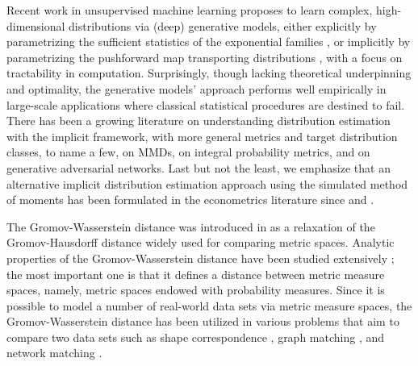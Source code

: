 \documentclass[11pt]{article}
\begin{document}
Recent work in unsupervised machine learning proposes to learn complex, high-dimensional distributions via (deep) generative models, either explicitly by parametrizing the sufficient statistics of the exponential families \citep{doersch2016TutorialVariationalAutoencoders,kingma2013auto}, or implicitly by parametrizing the pushforward map transporting distributions \citep{dziugaite_roy_ghahramani_2015,goodfellow_2014}, with a focus on tractability in computation. Surprisingly, though lacking theoretical underpinning and optimality, the generative models’ approach performs well empirically in large-scale applications where classical statistical procedures are destined to fail. There has been a growing literature on understanding distribution estimation with the implicit framework, with more general metrics and target distribution classes, to name a few, \cite{muandet_fukumizu_sriperumbudur_scholkopf_2017, li_swersky_zemel_2015, dziugaite_roy_ghahramani_2015} on MMDs, \cite{sriperumbudur2012empirical, liang2019EstimatingCertain} on integral probability metrics, and \cite{mroueh2017sobolev, arora2017generalization,liang2018HowWell,singh2018minimax,bai2018approximability, weed2019estimation, lei2019sgd, chen2020statistical} on generative adversarial networks. Last but not the least, we emphasize that an alternative implicit distribution estimation approach using the simulated method of moments has been formulated in the econometrics literature since \cite{mcfadden1989MethodSimulated,pakes1989SimulationAsymptotics} and \cite{gourieroux1997SimulationbasedEconometric}. 


The Gromov-Wasserstein distance was introduced in \cite{memoli_2007} as a relaxation of the Gromov-Hausdorff distance widely used for comparing metric spaces. Analytic properties of the Gromov-Wasserstein distance have been studied extensively \citep{memoli_2011,sturm_2012}; the most important one is that it defines a distance between metric measure spaces, namely, metric spaces endowed with probability measures. Since it is possible to model a number of real-world data sets via metric measure spaces, the Gromov-Wasserstein distance has been utilized in various problems that aim to compare two data sets such as shape correspondence \citep{solomon_etal_2016}, graph matching \citep{xu_luo_zha_duke_2019}, and network matching \citep{chowdhury_memoli_2019}.
\end{document}
